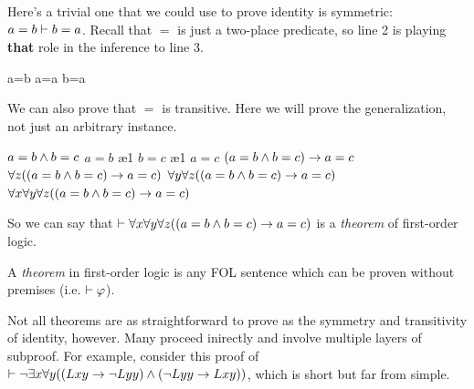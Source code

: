 Here's a trivial one that we could use to prove identity is symmetric:
$a=b\vdash b=a$. Recall that $=$ is just a two-place predicate, so line 2 is
playing \textbf{that} role in the inference to line 3.

\begin{fitchproof}
   {a=b} 
   {a=a} 
   {b=a} 
\end{fitchproof}

We can also prove that $=$ is transitive. Here we will prove the generalization,
not just an arbitrary instance.

\begin{fitchproof}
  \open
   {$a=b \wedge b=c$}                                 
   {$a=b$}                                           \ae{1}
   {$b=c$}                                           \ae{1}
   {$a=c$}                                           
  \close
   {$(a=b \wedge b=c)\rightarrow a=c$}                       
   {$\forall z((a=b \wedge b=c)\rightarrow a=c)$}           
   {$\forall y\forall z((a=b \wedge b=c)\rightarrow a=c)$} 
   {$\forall x\forall y\forall z((a=b \wedge b=c)\rightarrow a=c)$} 
\end{fitchproof}

So we can say that
$\vdash\forall x\forall y\forall z((a=b \wedge b=c)\rightarrow a=c)$ is a
\emph{theorem} of first-order logic.

\begin{definition}
  A \emph{theorem} in first-order logic is any FOL sentence \ephi which can be
  proven without premises (i.e. $\vdash\varphi$).
\end{definition}

Not all theorems are as straightforward to prove as the symmetry and
transitivity of identity, however. Many proceed inirectly and involve multiple
layers of subproof. For example, consider this proof of
$\vdash\neg\exists x\forall y((Lxy\rightarrow\neg Lyy)\wedge(\neg Lyy\rightarrow Lxy))$,
which is short but far from simple.

